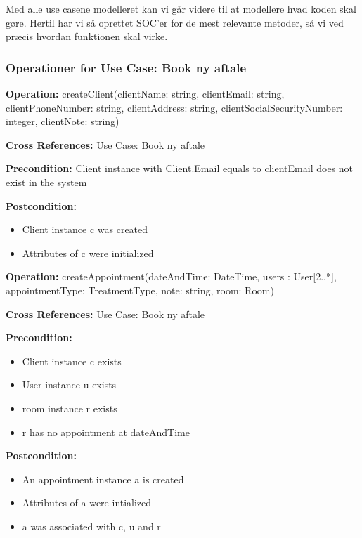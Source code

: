 %
%
%
 
Med alle use casene modelleret kan vi går videre til at modellere hvad koden skal gøre. Hertil har vi så oprettet SOC'er for de mest relevante metoder, så vi ved præcis hvordan funktionen skal virke.


\subsubsection{Operationer for Use Case: Book ny aftale}\label{Operation:Book ny aftale}

\noindent

\textbf{Operation:} createClient(clientName: string, clientEmail: string, clientPhoneNumber: string, clientAddress: string, clientSocialSecurityNumber: integer, clientNote: string) 

\textbf{Cross References:} Use Case: Book ny aftale 

\textbf{Precondition:} Client instance with Client.Email equals to clientEmail does not exist in the system

\textbf{Postcondition:}  
		\begin{itemize}
			\item Client instance c was created 
			\item Attributes of c were initialized
		\end{itemize}
 

\textbf{Operation:} createAppointment(dateAndTime: DateTime, users : User[2..*], appointmentType: TreatmentType, note: string, room: Room) 

\textbf{Cross References:} Use Case: Book ny aftale 

\textbf{Precondition: }
		\begin{itemize}
			\item Client instance c exists 
			\item User instance u exists 
			\item room instance r exists 
			\item r has no appointment at dateAndTime
		\end{itemize}
		
\textbf{Postcondition:}  
        \begin{itemize}
            \item An appointment instance a is created
            \item Attributes of a were intialized
            \item a was associated with c, u and r
        \end{itemize}
        
